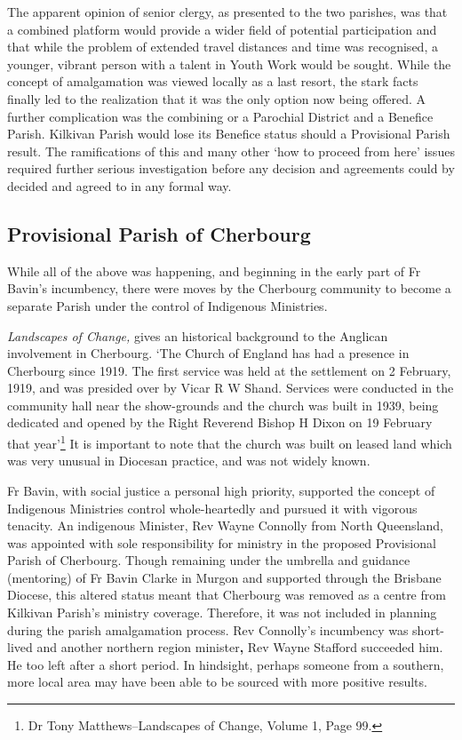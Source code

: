 The apparent opinion of senior clergy, as presented to the two parishes, was that a combined platform would provide a wider field of potential participation and that while the problem of extended travel distances and time was recognised, a younger, vibrant person with a talent in Youth Work would be sought. While the concept of amalgamation was viewed locally as a last resort, the stark facts finally led to the realization that it was the only option now being offered. A further complication was the combining or a Parochial District and a Benefice Parish. Kilkivan Parish would lose its Benefice status should a Provisional Parish result. The ramifications of this and many other `how to proceed from here' issues required further serious investigation before any decision and agreements could by decided and agreed to in any formal way.



\subsection{Provisional Parish of Cherbourg}



While all of the above was happening, and beginning in the early part of Fr Bavin's incumbency, there were moves by the Cherbourg community to become a separate Parish under the control of Indigenous Ministries.



\emph{Landscapes of Change,} gives an historical background to the Anglican involvement in Cherbourg. `The Church of England has had a presence in Cherbourg since 1919. The first service was held at the settlement on 2 February, 1919, and was presided over by Vicar R W Shand. Services were conducted in the community hall near the show-grounds and the church was built in 1939, being dedicated and opened by the Right Reverend Bishop H Dixon on 19 February that year'\footnote{Dr Tony Matthews--Landscapes of Change, Volume 1, Page 99.} It is important to note that the church was built on leased land which was very unusual in Diocesan practice, and was not widely known.


Fr Bavin, with social justice a personal high priority, supported the concept of Indigenous Ministries control whole-heartedly and pursued it with vigorous tenacity. An indigenous Minister, Rev Wayne Connolly from North Queensland, was appointed with sole responsibility for ministry in the proposed Provisional Parish of Cherbourg. Though remaining under the umbrella and guidance (mentoring) of Fr Bavin Clarke in Murgon and supported through the Brisbane Diocese, this altered status meant that Cherbourg was removed as a centre from Kilkivan Parish's ministry coverage. Therefore, it was not included in planning during the parish amalgamation process. Rev Connolly's incumbency was short-lived and another northern region minister\textbf{,} Rev Wayne Stafford succeeded him. He too left after a short period. In hindsight, perhaps someone from a southern, more local area may have been able to be sourced with more positive results.



